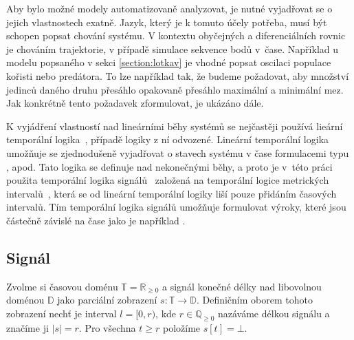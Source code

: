 Aby bylo možné modely automatizovaně analyzovat, je nutné vyjadřovat se o jejich
vlastnostech exatně. Jazyk, který je k tomuto účely potřeba, musí být schopen 
popsat chování systému. V kontextu obyčejných a di\-fe\-ren\-ci\-ál\-ních rovnic je
chováním trajektorie, v případě simulace sekvence bodů v~čase. Například u modelu
popsaného v sekci \ref{section:lotkav} je vhodné popsat oscilaci populace kořisti
nebo predátora. To lze například tak, že budeme požadovat, aby množství jedinců
daného druhu přesáhlo opakovaně pře\-sáh\-lo maximální a minimální mez. Jak konkrétně
tento požadavek zformulovat, je ukázáno dále.


K vyjádření vlastností nad lineárními běhy systémů se nejčastěji používá lieární
temporální logika~\cite{strejcek2007}, případě logiky z ní odvozené.
Lineární temporální logika u\-mož\-ňu\-je se zjednodušeně vyjadřovat o sta\-vech
systému v čase formulacemi typu ,  apod.
Tato logika se definuje nad nekonečnými běhy, a proto je v~této práci použita temporální logika
signálů~\cite{maler2004} založená na temporální logice metrických intervalů~\cite{alur1996},
která se od lineární temporální logiky liší pouze přidáním ča\-so\-vých intervalů. Tím temporální
logika signálů u\-mož\-ňu\-je formulovat výroky, které jsou částečně závislé na čase jako
je například  .

\subsection{Signál}

Zvolme si časovou doménu $\mathbb{T} = \mathbb{R}_{\geq 0}$ a signál konečné délky
nad libovolnou doménou $\mathbb{D}$ jako parciální zobrazení $s: \mathbb{T} \rightarrow \mathbb{D}$.
Definičním oborem tohoto zobrazení nechť je interval $l = [0, r)$, kde $r \in \mathbb{Q}_{\geq0}$ nazáváme
délkou signálu a značíme ji $|s| = r$. Pro všechna $t \geq r$ položíme $s[t] = \bot$.

